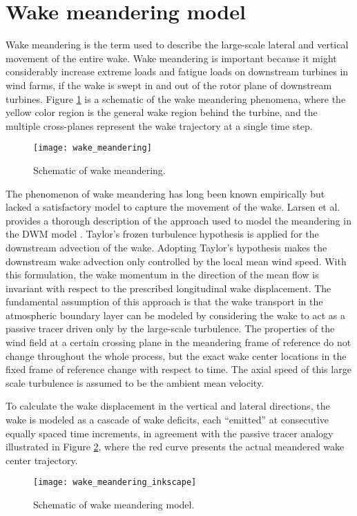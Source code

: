 \documentclass{umthesis}
\begin{document}
\section{Wake meandering model} \label{sec:wake_meandering}
Wake meandering is the term used to describe the large-scale lateral and vertical movement of the entire wake. Wake meandering is important because it might considerably increase extreme loads and fatigue loads on downstream turbines in wind farms, if the wake is swept in and out of the rotor plane of downstream turbines. Figure \ref{fig:wake_meandering} is a schematic of the wake meandering phenomena, where the yellow color region is the general wake region behind the turbine, and the multiple cross-planes represent the wake trajectory at a single time step.

\begin{figure}
  \centering
  \texttt{[image: wake\_meandering]}
  \caption{Schematic of wake meandering.}\label{fig:wake_meandering}
\end{figure}

The phenomenon of wake meandering has long been known empirically but lacked a satisfactory model to capture the movement of the wake. Larsen et al. provides a thorough description of the approach used to model the meandering in the DWM model \cite{Larsen_meandering}. Taylor's frozen turbulence hypothesis is applied for the downstream advection of the wake. Adopting Taylor's hypothesis makes the downstream wake advection only controlled by the local mean wind speed. With this formulation, the wake momentum in the direction of the mean flow is invariant with respect to the prescribed longitudinal wake displacement. The fundamental assumption of this approach is that the wake transport in the atmospheric boundary layer can be modeled by considering the wake to act as a passive tracer driven only by the large-scale turbulence. The properties of the wind field at a certain crossing plane in the meandering frame of reference do not change throughout the whole process, but the exact wake center locations in the fixed frame of reference change with respect to time. The axial speed of this large scale turbulence is assumed to be the ambient mean velocity.

To calculate the wake displacement in the vertical and lateral directions, the wake is modeled as a cascade of wake deficits, each “emitted” at consecutive equally spaced time increments, in agreement with the passive tracer analogy \cite{Larsen_meandering} illustrated in Figure \ref{fig:wake_meandering_inkscape}, where the red curve presents the actual meandered wake center trajectory.
\begin{figure}
  \centering
  \texttt{[image: wake\_meandering\_inkscape]}
  \caption{Schematic of wake meandering model.}\label{fig:wake_meandering_inkscape}
\end{figure}
\end{document}
